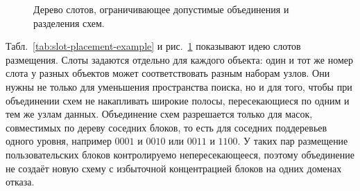 {\begin{figure}[ht]
\begin{center}
{%
}
\caption{\label{fig:slot-tree}
Дерево слотов, ограничивающее допустимые объединения и разделения схем.}
\end{center}
\end{figure}

Табл.~\ref{tab:slot-placement-example} и рис.~\ref{fig:slot-tree} показывают
идею слотов размещения. Слоты задаются отдельно для каждого объекта: один и тот
же номер слота у разных объектов может соответствовать разным наборам узлов.
Они нужны не только для уменьшения пространства поиска, но и для того, чтобы
при объединении схем не накапливать широкие полосы, пересекающиеся по одним и
тем же узлам данных. Объединение схем разрешается только для масок, совместимых
по дереву соседних блоков, то есть для соседних поддеревьев одного уровня,
например \(0001\) и \(0010\) или \(0011\) и \(1100\). У таких пар размещение
пользовательских блоков контролируемо непересекающееся, поэтому объединение не
создаёт новую схему с избыточной концентрацией блоков на одних доменах отказа.
}

